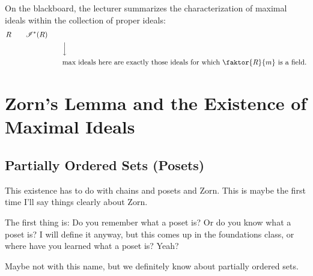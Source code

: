 \begin{content}
On the blackboard, the lecturer summarizes the characterization of maximal ideals within the collection of proper ideals:
\begin{align*}
R \qquad \mathscr{I}^*(R) \qquad & \\
&\Big\downarrow \\
&\text{max ideals here are exactly those ideals for which } \faktor{R}{m} \text{ is a field.}
\end{align*}

\end{content}

\section{Zorn's Lemma and the Existence of Maximal Ideals}

\subsection{Partially Ordered Sets (Posets)}

\begin{speech}[00:26:28 - 00:27:00]
This existence has to do with chains and posets and Zorn. This is maybe the first time I'll say things clearly about Zorn.

The first thing is: Do you remember what a poset is? Or do you know what a poset is? I will define it anyway, but this comes up in the foundations class, or where have you learned what a poset is? Yeah?
\end{speech}

\begin{student}
Maybe not with this name, but we definitely know about partially ordered sets.
\end{student}

